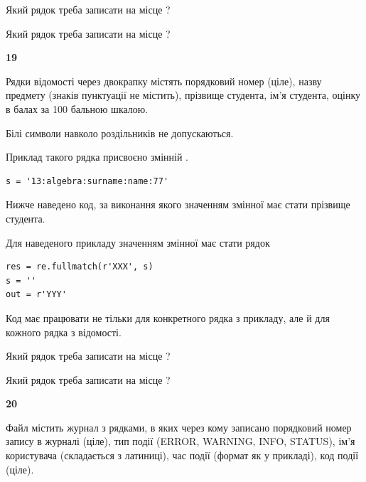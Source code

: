 Який рядок треба записати на місце  ?\par
\vspace{5mm}


Який рядок треба записати на місце  ?\par


\newpage

{\begin {center}\textbf{ 19}\end {center}}\par
Рядки відомості через двокрапку містять порядковий номер (ціле), назву предмету (знаків пунктуації не містить), прізвище студента, ім'я студента, оцінку в балах за 100 бальною шкалою.

Білі символи навколо роздільників не допускаються.

Приклад такого рядка присвоєно змінній .



\begin{verbatim}
s = '13:algebra:surname:name:77'
\end{verbatim}


Нижче наведено код, за виконання якого значенням змінної  має стати прізвище студента.

Для наведеного прикладу значенням змінної  має стати рядок 



\begin{verbatim}
res = re.fullmatch(r'XXX', s)
s = ''
out = r'YYY'
\end{verbatim}


Код має працювати не тільки для конкретного рядка з прикладу, але й для кожного рядка з відомості.




Який рядок треба записати на місце  ?\par
\vspace{5mm}


Який рядок треба записати на місце  ?\par


\newpage

{\begin {center}\textbf{ 20}\end {center}}\par
Файл  містить журнал з рядками, в яких через кому записано поряд\-ко\-вий номер запису в журналі (ціле), тип події (ERROR, WARNING, INFO, STATUS), ім'я користувача (складається з латиниці), час події (фор\-мат як у прикладі), код події (ціле).

